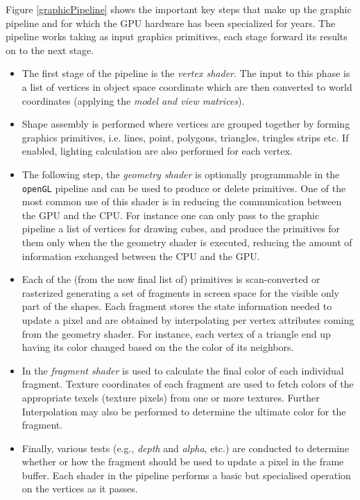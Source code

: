 \begin{description}
     Figure \ref{graphicPipeline} shows the important key steps that make up the graphic pipeline and for which the GPU hardware has been specialized for years. The pipeline works taking as input graphics primitives, each stage forward its results on to the next stage.
    \begin{itemize}
    	\item     The first stage of the pipeline is the \textit{vertex shader}. The
    	input to this phase is a list of vertices in object space coordinate which are then converted to world coordinates (applying the \textit{model and view matrices}).
    	\item  Shape assembly is performed where vertices are grouped together by forming graphics primitives, i.e. lines, point, polygons, triangles, tringles strips etc. If enabled, lighting calculation are also performed for each vertex.
    	\item   The following step, the \textit{geometry shader} is optionally programmable in the \texttt{openGL} pipeline and can be used to produce or delete primitives. One of the most common use of this shader is in reducing the communication between the GPU and the CPU. For instance one can only pass to the graphic pipeline a list of vertices for drawing cubes, and produce the primitives for them only when the the geometry shader is executed, reducing the amount of information exchanged between the CPU and the GPU.
    	\item   Each of the (from the now final list of) primitives is scan-converted or rasterized generating a set of fragments in screen space for the visible only part of the shapes. Each fragment stores the state information needed to update a pixel and are obtained by interpolating per vertex attributes coming from the geometry shader. For instance, each vertex of a triangle end up having its color changed based on the the color of its neighbors. 
    	\item  In the \textit{fragment  shader} is used to calculate the final color of each individual fragment. Texture coordinates of each fragment are used to fetch colors of the appropriate texels (texture pixels) from
    	one or more textures. Further Interpolation may also be
    	performed to determine the ultimate color for the fragment.
    	\item Finally, various tests (e.g., \textit{depth} and \textit{alpha}, etc.) are conducted to determine whether or how the fragment should be used to update a pixel in the frame buffer.    
    	Each shader in the pipeline performs a basic but specialised operation on the
    	vertices as it passes. 
    \end{itemize}


\end{description}
